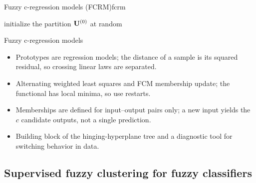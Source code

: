 \begin{algobox}{Fuzzy c-regression models (FCRM)}{fcrm}
\begin{algorithm}[H]
initialize the partition $\mathbf{U}^{(0)}$ at random\;
\end{algorithm}
\end{algobox}
\begin{summarybox}{Fuzzy c-regression models}
\begin{itemize}
  \item Prototypes are regression models; the distance of a sample is its squared residual, so crossing linear laws are separated.
  \item Alternating weighted least squares and FCM membership update; the functional has local minima, so use restarts.
  \item Memberships are defined for input--output pairs only; a new input yields the $c$ candidate outputs, not a single prediction.
  \item Building block of the hinging-hyperplane tree and a diagnostic tool for switching behavior in data.
\end{itemize}
\end{summarybox}

\subsection{Supervised fuzzy clustering for fuzzy classifiers}\label{sec:models:supervised}

